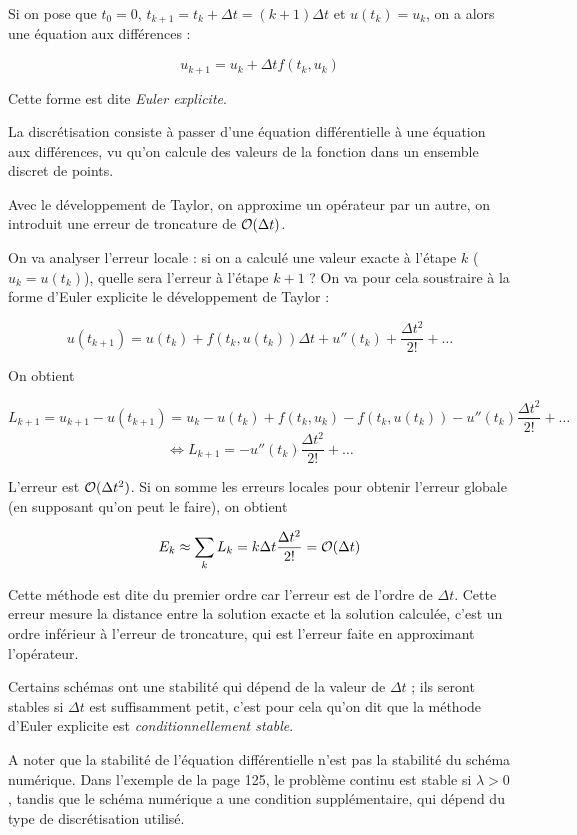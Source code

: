 		Si on pose que $t_0 = 0$, $t_{k + 1} = t_k + \Delta t = (k + 1) \Delta t$ et $u(t_k) = u_k$, on a alors une équation aux différences :
	
		$$u_{k + 1} = u_k + \Delta t f(t_k, u_k)$$
	
		Cette forme est dite \textit{Euler explicite}.
	
		La discrétisation consiste à passer d'une équation différentielle à une équation aux différences, vu qu'on calcule des valeurs de la fonction dans un ensemble discret de points.
	
		Avec le développement de Taylor, on approxime un opérateur par un autre, on introduit une erreur de troncature de $\mathcal{O} (\Delta t)$.
	
		On va analyser l'erreur locale : si on a calculé une valeur exacte à l'étape $k$ ($u_k = u(t_k)$), quelle sera l'erreur à l'étape $k + 1$ ? On va pour cela soustraire à la forme d'Euler explicite le développement de Taylor :
	
		$$u(t_{k + 1}) = u(t_k) + f(t_k, u(t_k)) \Delta t + u''(t_k) + \frac{\Delta t^2}{2!} + \dots$$
	
		On obtient
	
	$$L_{k + 1} = u_{k + 1} - u(t_{k + 1}) = u_k - u(t_k) + f(t_k, u_k) - f(t_k, u(t_k)) - u''(t_k) \frac{\Delta t^2}{2!} + \dots$$
	$$\Leftrightarrow L_{k + 1}= -u'' (t_k) \frac{\Delta t^2}{2!} + \dots $$
	
		L'erreur est $\mathcal{O} (\Delta t^2)$. Si on somme les erreurs locales pour obtenir l'erreur globale (en supposant qu'on peut le faire), on obtient
	
		$$E_k \approx \sum_k L_k = k \Delta t \frac{\Delta t^2}{2!} = \mathcal{O} (\Delta t)$$
	
		Cette méthode est dite du premier ordre car l'erreur est de l'ordre de $\Delta t$. Cette erreur mesure la distance entre la solution exacte et la solution calculée, c'est un ordre inférieur à l'erreur de troncature, qui est l'erreur faite en approximant l'opérateur.
	
		Certains schémas ont une stabilité qui dépend de la valeur de $\Delta t$ ; ils seront stables si $\Delta t$ est suffisamment petit, c'est pour cela qu'on dit que la méthode d'Euler explicite est \textit{conditionnellement stable}.
	
		A noter que la stabilité de l'équation différentielle n'est pas la stabilité du schéma numérique. Dans l'exemple de la page 125, le problème continu est stable si $\lambda > 0$, tandis que le schéma numérique a une condition supplémentaire, qui dépend du type de discrétisation utilisé.
		

